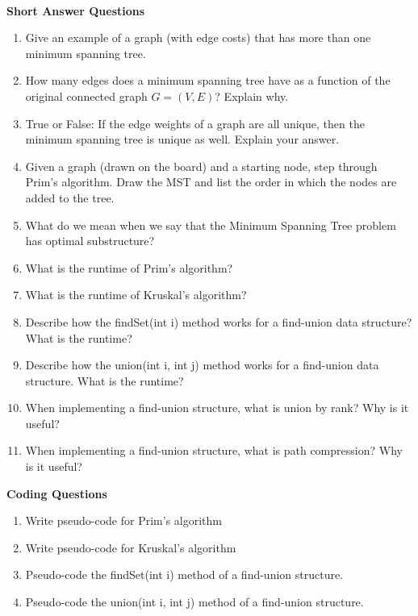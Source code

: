 \documentclass[10pt]{article}
\begin{document}
\noindent \\
\textbf{Short Answer Questions}

\begin{enumerate}
	\setlength\itemsep{0.25em}
	\item Give an example of a graph (with edge costs) that has more than one minimum spanning tree.
	\item How many edges does a minimum spanning tree have as a function of the original connected graph $G=(V,E)$? Explain why.
	\item True or False: If the edge weights of a graph are all unique, then the minimum spanning tree is unique as well. Explain your answer.
	\item Given a graph (drawn on the board) and a starting node, step through Prim's algorithm. Draw the MST and list the order in which the nodes are added to the tree.
	\item What do we mean when we say that the Minimum Spanning Tree problem has optimal substructure?
	\item What is the runtime of Prim's algorithm?
	\item What is the runtime of Kruskal's algorithm?
	\item Describe how the findSet(int i) method works for a find-union data structure? What is the runtime?
	\item Describe how the union(int i, int j) method works for a find-union data structure. What is the runtime?
	\item When implementing a find-union structure, what is union by rank? Why is it useful?
	\item When implementing a find-union structure, what is path compression? Why is it useful?

\end{enumerate}

\vspace{0.5in}

\textbf{Coding Questions}
\begin{enumerate}
	\setlength\itemsep{0.25em}
	\item Write pseudo-code for Prim's algorithm
	\item Write pseudo-code for Kruskal's algorithm
	\item Pseudo-code the findSet(int i) method of a find-union structure.
	\item Pseudo-code the union(int i, int j) method of a find-union structure.

\end{enumerate}


\end{document}
